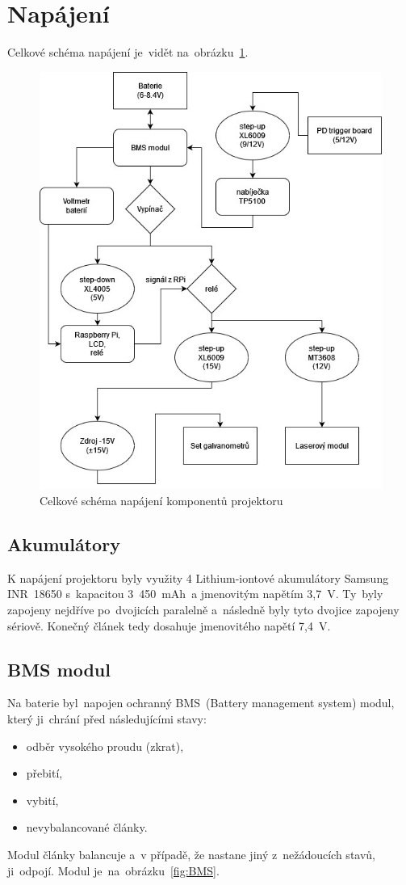 \section{Napájení}
Celkové schéma napájení je~vidět na~obrázku~\ref{fig:power-schem-full}.

\begin{figure}[!h]
  \centering
  \includegraphics[width=\textwidth]{img/power-schem-full.jpg}
  \caption{\label{fig:power-schem-full} Celkové schéma napájení komponentů projektoru}
\end{figure}

\subsection{Akumulátory}
K napájení projektoru byly využity 4 Lithium-iontové akumulátory Samsung INR~18650 s~kapacitou 3~450~mAh~a jmenovitým napětím 3,7~V. Ty~byly zapojeny nejdříve po~dvojicích paralelně a~následně byly tyto dvojice zapojeny sériově. Konečný článek tedy dosahuje jmenovitého napětí 7,4~V.
\
\subsection{BMS modul}
Na baterie byl~napojen ochranný BMS~(Battery management system) modul, který ji~chrání před následujícími stavy:
\begin{itemize}
  \item odběr vysokého proudu (zkrat),
  \item přebití,
  \item vybití,
  \item nevybalancované články.
\end{itemize}
Modul články balancuje a~v případě, že nastane jiný z~nežádoucích stavů, ji~odpojí. Modul je~na~obrázku~\ref{fig:BMS}.


